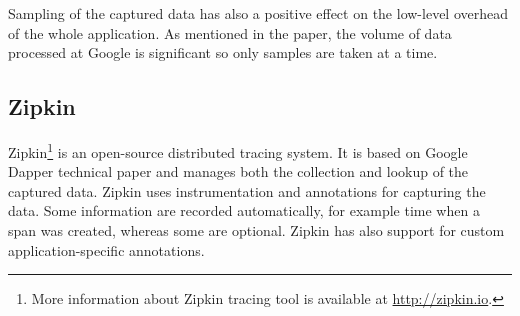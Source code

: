 Sampling of the captured data has also a positive effect on the low-level overhead of the whole application. As mentioned in the paper, the volume of data processed at Google is significant so only samples are taken at a time.

\subsection{Zipkin}
\label{zipkin}
Zipkin\footnote{More information about Zipkin tracing tool is available at \url{http://zipkin.io}.} is an open-source distributed tracing system. It is based on Google Dapper technical paper and manages both the collection and lookup of the captured data. Zipkin uses instrumentation and annotations for capturing the data. Some
information are recorded automatically, for example time when a span was created, whereas some are optional. Zipkin has also support for custom application-specific annotations.


